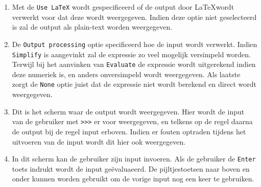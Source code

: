 \documentclass[a4paper]{article}
\begin{document}
\begin{enumerate}
\item Met de \texttt{Use LaTeX} wordt gespecificeerd of de output door \LaTeX wordt verwerkt voor dat deze wordt weergegeven. Indien deze optie niet geselecteerd is zal de output als plain-text worden weergegeven.
\item De \texttt{Output processing} optie specificeerd hoe de input wordt verwerkt. Indien \texttt{Simplify} is aangevinkt zal de expressie zo veel mogelijk versimpeld worden. Terwijl bij het aanvinken van \texttt{Evaluate} de expressie wordt uitgerekend indien deze numeriek is, en anders onversimpeld wordt weergegeven. Als laatste zorgt de \texttt{None} optie juist dat de expressie niet wordt berekend en direct wordt weergegeven.
\item Dit is het scherm waar de output wordt weergegeven. Hier wordt de input van de gebruiker met \texttt{>>>} er voor weergegeven, en telkens op de regel daarna de output bij de regel input erboven. Indien er fouten optraden tijdens het uitvoeren van de input wordt dit hier ook weergegeven.
\item In dit scherm kan de gebruiker zijn input invoeren. Als de gebruiker de \texttt{Enter} toets indrukt wordt de input ge\"evaluaeerd. De pijltjestoetsen naar boven en onder kunnen worden gebruikt om de vorige input nog een keer te gebruiken.
\end{enumerate}
\end{document}
